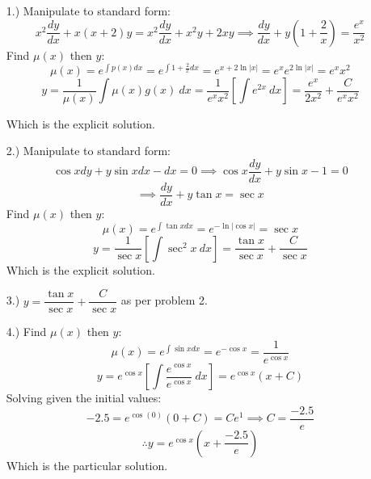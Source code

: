 \documentclass[12pt]{article}
\newcommand{\bracks}[1]{\left[#1\right]}
\newcommand{\derv}[2]{\dfrac{d#1}{d#2}}
\begin{document}
\pagestyle{fancy}
\fancyhead{}

\normalsize
\begin{itemize}
    \item [1.)] Manipulate to standard form:
    \begin{equation*}
        x^2\derv{y}{x}+x(x+2)y=x^2\derv{y}{x}+x^2y+2xy\implies \derv{y}{x}+y\left(1+\dfrac{2}{x}\right)=\dfrac{e^x}{x^2}
    \end{equation*}
    Find $\mu(x)$ then $y$:
    \begin{equation*}
        \mu(x)=e^{\int p(x)dx}=e^{\int1+\frac{2}{x}dx}=e^{x+2\ln\vert x\vert}=e^xe^{2\ln\vert x\vert}=e^xx^2
    \end{equation*}
    \begin{equation*}
        y=\dfrac{1}{\mu(x)}\int\mu(x)g(x)\ dx=\dfrac{1}{e^xx^2}\bracks{\int e^{2x}\ dx}=\dfrac{e^x}{2x^2}+\dfrac{C}{e^xx^2}
    \end{equation*}

    Which is the explicit solution.

    \item [2.)] Manipulate to standard form:
    \begin{equation*}
        \cos xdy+y\sin xdx-dx=0\implies \cos x\derv{y}{x}+y\sin x-1=0
    \end{equation*}
    \begin{equation*}
        \implies\derv{y}{x}+y\tan x=\sec x
    \end{equation*}
    Find $\mu(x)$ then $y$:
    \begin{equation*}
        \mu(x)=e^{\int\tan xdx}=e^{-\ln\vert\cos x\vert}=\sec x
    \end{equation*}
    \begin{equation*}
        y=\dfrac{1}{\sec x}\bracks{\int\sec^2x\ dx}=\dfrac{\tan x}{\sec x}+\dfrac{C}{\sec x}
    \end{equation*}
    Which is the explicit solution.

    \item [3.)] $y=\dfrac{\tan x}{\sec x}+\dfrac{C}{\sec x}$ as per problem 2.

    \item [4.)] Find $\mu(x)$ then $y$:
    \begin{equation*}
        \mu(x)=e^{\int \sin xdx}=e^{-\cos x}=\dfrac{1}{e^{\cos x}}
    \end{equation*}
    \begin{equation*}
        y=e^{\cos x}\bracks{\int\dfrac{e^{\cos x}}{e^{\cos x}}\ dx}=e^{\cos x}(x+C)
    \end{equation*}
    Solving given the initial values:
    \begin{equation*}
        -2.5=e^{\cos(0)}(0+C)=Ce^1\implies C=\dfrac{-2.5}{e}
    \end{equation*}
    \begin{equation*}
        \therefore y=e^{\cos x}\left(x+\dfrac{-2.5}{e}\right)
    \end{equation*}
    Which is the particular solution.


\end{itemize}
\end{document}
